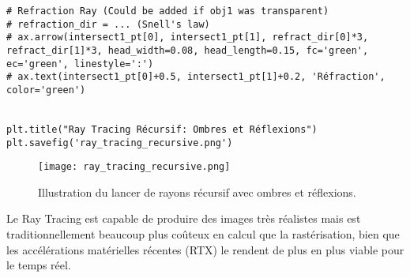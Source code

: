 \documentclass{article}
\begin{document}
\begin{verbatim}
# Refraction Ray (Could be added if obj1 was transparent)
# refraction_dir = ... (Snell's law)
# ax.arrow(intersect1_pt[0], intersect1_pt[1], refract_dir[0]*3, refract_dir[1]*3, head_width=0.08, head_length=0.15, fc='green', ec='green', linestyle=':')
# ax.text(intersect1_pt[0]+0.5, intersect1_pt[1]+0.2, 'Réfraction', color='green')


plt.title("Ray Tracing Récursif: Ombres et Réflexions")
plt.savefig('ray_tracing_recursive.png')

\end{verbatim}

\begin{figure}[H]
\centering
\texttt{[image: ray\_tracing\_recursive.png]}
\caption{Illustration du lancer de rayons récursif avec ombres et réflexions.}
\label{fig:ray_tracing_recursive}
\end{figure}

Le Ray Tracing est capable de produire des images très réalistes mais est traditionnellement beaucoup plus coûteux en calcul que la rastérisation, bien que les accélérations matérielles récentes (RTX) le rendent de plus en plus viable pour le temps réel.
\end{document}
